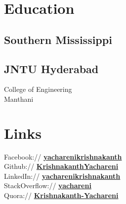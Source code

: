 \documentclass[]{kk-resume-openfont}
\begin{document}
%
%
\lastupdated

%
%

%
%

\begin{minipage}[t]{0.33\textwidth} 


\section{Education} 

\subsection{Southern Mississippi}
\sectionsep

\subsection{JNTU Hyderabad}
College of Engineering \\
Manthani\\
\sectionsep


\section{Links} 
Facebook:// \href{https://www.facebook.com/yacharenikrishnakanth/}{\bf yacharenikrishnakanth} \\
Github:// \href{https://github.com/KrishnakanthYachareni}{\bf KrishnakanthYachareni} \\
LinkedIn://  \href{https://www.linkedin.com/in/yacharenikrishnakanth/}{\bf yacharenikrishnakanth} \\
StackOverflow://  \href{https://stackoverflow.com/users/6436720/yachareni-krishnakanth}{\bf yachareni} \\
Quora://  \href{https://www.quora.com/profile/Krishnakanth-Yachareni}{\bf Krishnakanth-Yachareni}


\end{minipage}
\end{document}

